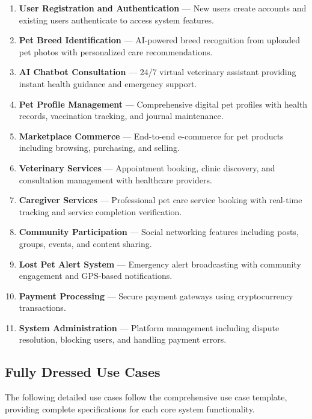 \begin{enumerate}
    \item \textbf{User Registration and Authentication} --- New users create accounts and existing users authenticate to access system features.
    \item \textbf{Pet Breed Identification} --- AI-powered breed recognition from uploaded pet photos with personalized care recommendations.
    \item \textbf{AI Chatbot Consultation} --- 24/7 virtual veterinary assistant providing instant health guidance and emergency support.
    \item \textbf{Pet Profile Management} --- Comprehensive digital pet profiles with health records, vaccination tracking, and journal maintenance.
    \item \textbf{Marketplace Commerce} --- End-to-end e-commerce for pet products including browsing, purchasing, and selling.
    \item \textbf{Veterinary Services} --- Appointment booking, clinic discovery, and consultation management with healthcare providers.
    \item \textbf{Caregiver Services} --- Professional pet care service booking with real-time tracking and service completion verification.
    \item \textbf{Community Participation} --- Social networking features including posts, groups, events, and content sharing.
    \item \textbf{Lost Pet Alert System} --- Emergency alert broadcasting with community engagement and GPS-based notifications.
    \item \textbf{Payment Processing} --- Secure payment gateways using cryptocurrency transactions.
    \item \textbf{System Administration} --- Platform management including dispute resolution, blocking users, and handling payment errors.
\end{enumerate}

\subsection{Fully Dressed Use Cases}
The following detailed use cases follow the comprehensive use case template, providing complete specifications for each core system functionality.

